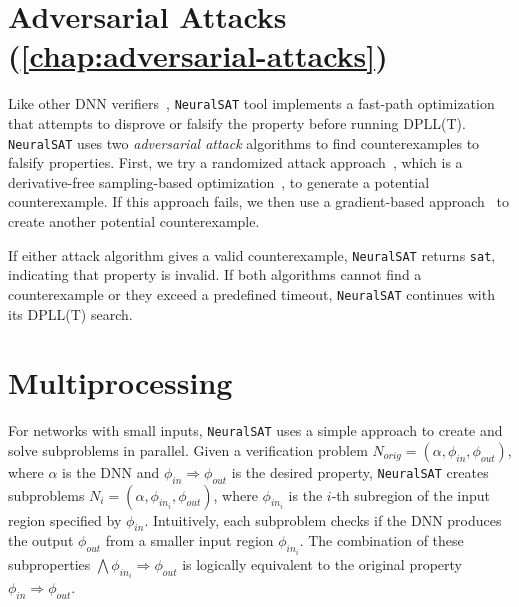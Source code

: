 \documentclass[oneside,11pt,dvipsnames]{book}
\numberwithin{equation}{section}
\theoremstyle{definition}
\theoremstyle{remark}
\newcommand{\tvn}[1]{\iftoggle{usecomment}{{\color{red}{[TVN]: #1}}}{}}
\newcommand{\ignore}[1]{}
\newcommand{\tool}{\texttt{NeuralSAT}}
\begin{document}
\ignore{
\subsection{Decision Heuristics}\label{sec:decision-heuristics}
Decision or branching heuristics decide free variables to make assignments and thus are crucial for the scalability of DPLL by reducing assignment mistakes~\cite{kroening2016decision,beyer2022progress}.

For networks with small inputs, \tool{} prioritizes variables representing neurons with the \emph{furthest bounds} from the decision value 0 of ReLU, i.e., the 0 in $\max(x,0)$.
Such neurons have wider bounds and therefore are more difficult to tighten during abstraction compared to other neurons.
This heuristic helps input bounds tightening as described in \S\ref{sec:inputboundstigthten} (which is also applied only for networks with small inputs). It is also cheap because we can reuse the computed boundaries of hidden neurons during abstraction.
}


\section{Adversarial Attacks (\autoref{chap:adversarial-attacks})} Like other DNN verifiers~\cite{ferrari2022complete,zhang2022general}, \tool{} tool implements a fast-path optimization that attempts to disprove or falsify the property before running DPLL(T).
\tool{} uses two \emph{adversarial attack} algorithms to find counterexamples to falsify properties.
First, we try a randomized attack approach~\cite{das2021fast}, which is a derivative-free sampling-based optimization~\cite{yu2016derivative}, to generate a potential counterexample.
If this approach fails, we then use a gradient-based approach~\cite{madry2017towards} to create another potential counterexample.

If either attack algorithm gives a valid counterexample, \tool{} returns \texttt{sat}, indicating that property is invalid. If both algorithms cannot find a counterexample or they exceed a predefined timeout, \tool{} continues with its DPLL(T) search.



\section{Multiprocessing} \label{sec:input_split}
\tvn{Do we still use this?  or we use the Parallel DPLL(T) in~\autoref{sec:parallel-search} instead?}
For networks with small inputs, \tool{} uses a simple approach to create and solve subproblems in parallel.
Given a verification problem $N_{orig} = (\alpha, \phi_{in}, \phi_{out})$, where $\alpha$ is the DNN and $\phi_{in} \Rightarrow \phi_{out}$ is the desired property, \tool{} creates subproblems $N_i = (\alpha, \phi_{{in}_i}, \phi_{out})$, where $\phi_{{in}_i}$ is the $i$-th subregion of the input region specified by $\phi_{in}$.
Intuitively, each subproblem checks if the DNN produces the output $\phi_{out}$  from a smaller input region $\phi_{{in}_i}$.
The combination of these subproperties $\bigwedge \phi_{{in}_i} \Rightarrow \phi_{out}$ is logically equivalent to the original property $\phi_{in} \Rightarrow \phi_{out}$.
\end{document}
